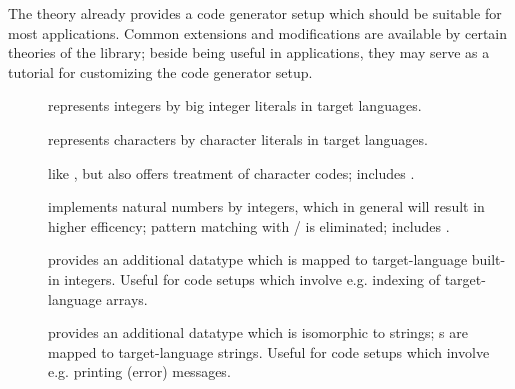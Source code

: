 \begin{isabellebody}
\begin{isamarkuptext}
\begin{itemize}
  \end{itemize}%
\end{isamarkuptext}%
\isamarkuptrue%
%
\isamarkuptrue%
%
\begin{isamarkuptext}%
The   theory already provides a code
  generator setup
  which should be suitable for most applications. Common extensions
  and modifications are available by certain theories of the 
  library; beside being useful in applications, they may serve
  as a tutorial for customizing the code generator setup.

  \begin{description}

    \item[] represents  integers by big
       integer literals in target languages.
    \item[] represents  characters by 
       character literals in target languages.
    \item[] like ,
       but also offers treatment of character codes; includes
       .
    \item[] \label{eff_nat} implements natural numbers by integers,
       which in general will result in higher efficency; pattern
       matching with  / 
       is eliminated;  includes .
    \item[] provides an additional datatype
        which is mapped to target-language built-in integers.
       Useful for code setups which involve e.g. indexing of
       target-language arrays.
    \item[] provides an additional datatype
        which is isomorphic to strings;
       s are mapped to target-language strings.
       Useful for code setups which involve e.g. printing (error) messages.

  \end{description}


\end{isamarkuptext}
\end{isabellebody}
